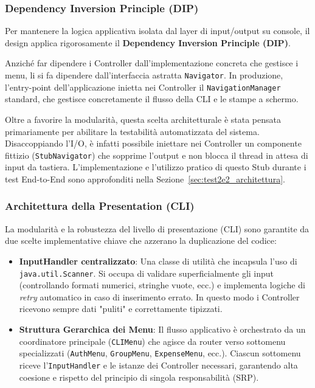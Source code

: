 \subsubsection{Dependency Inversion Principle (DIP)}

Per mantenere la logica applicativa isolata dal layer di input/output su console, 
il design applica rigorosamente il \textbf{Dependency Inversion Principle (DIP)}. 

Anziché far dipendere i Controller dall'implementazione concreta che gestisce i menu, 
li si fa dipendere dall'interfaccia astratta \texttt{Navigator}. 
In produzione, l'entry-point dell'applicazione inietta nei Controller il \texttt{NavigationManager} 
standard, che gestisce concretamente il flusso della CLI e le stampe a schermo. 

Oltre a favorire la modularità, questa scelta architetturale è stata pensata primariamente 
per abilitare la testabilità automatizzata del sistema. 
Disaccoppiando l'I/O, è infatti possibile iniettare nei Controller un componente fittizio 
(\texttt{StubNavigator}) che sopprime l'output e non blocca il thread in attesa di input 
da tastiera. L'implementazione e l'utilizzo pratico di questo Stub durante i test 
End-to-End sono approfonditi nella Sezione~\ref{sec:test2e2_architettura}.

\subsubsection{Architettura della Presentation (CLI)}

La modularità e la robustezza del livello di presentazione (CLI) sono garantite da 
due scelte implementative chiave che azzerano la duplicazione del codice:
\begin{itemize}
    \item \textbf{InputHandler centralizzato}: Una classe di utilità che incapsula l'uso di \texttt{java.util.Scanner}. 
    Si occupa di validare superficialmente gli input (controllando formati numerici, stringhe vuote, ecc.) 
    e implementa logiche di \textit{retry} automatico in caso di inserimento errato. 
    In questo modo i Controller ricevono sempre dati "puliti" e correttamente tipizzati.
    \item \textbf{Struttura Gerarchica dei Menu}: Il flusso applicativo è orchestrato da un coordinatore principale 
    (\texttt{CLIMenu}) che agisce da router verso sottomenu specializzati (\texttt{AuthMenu}, \texttt{GroupMenu}, \texttt{ExpenseMenu}, ecc.). 
    Ciascun sottomenu riceve l'\texttt{InputHandler} e le istanze dei Controller necessari, garantendo alta coesione e rispetto del principio di singola responsabilità (SRP).
\end{itemize}


